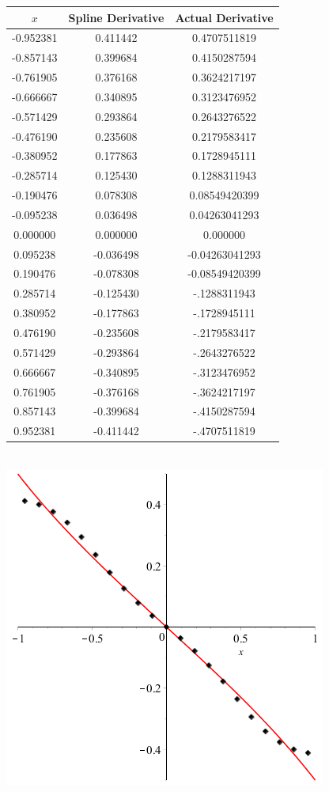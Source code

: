 \documentclass[11pt]{article} %
\begin{document}
\begin{tabular}{| c | c c |}
\hline
$x$ & Spline Derivative & Actual Derivative\\
\hline
-0.952381 & 0.411442 &  0.4707511819  \\
-0.857143 & 0.399684 & 0.4150287594 \\
-0.761905 & 0.376168 &  0.3624217197  \\
-0.666667 & 0.340895  & 0.3123476952  \\
-0.571429 & 0.293864 & 0.2643276522  \\
-0.476190 & 0.235608 & 0.2179583417  \\
-0.380952 & 0.177863 & 0.1728945111  \\
-0.285714 & 0.125430 & 0.1288311943  \\
-0.190476 & 0.078308 & 0.08549420399  \\
-0.095238 & 0.036498 &  0.04263041293 \\
0.000000 & 0.000000 &  0.000000  \\
0.095238 & -0.036498 & -0.04263041293\\
0.190476 & -0.078308  &  -0.08549420399 \\
0.285714 &  -0.125430 & -.1288311943  \\
0.380952 & -0.177863  &  -.1728945111 \\
0.476190 & -0.235608 &  -.2179583417 \\
0.571429 &-0.293864  & -.2643276522  \\
0.666667 & -0.340895  &  -.3123476952 \\
0.761905 & -0.376168 &  -.3624217197  \\
0.857143 & -0.399684 &  -.4150287594 \\
0.952381 & -0.411442 &  -.4707511819 \\

\hline
\end{tabular} \\

\includegraphics[scale=1]{plots/deriv3plot.png}
\end{document}
